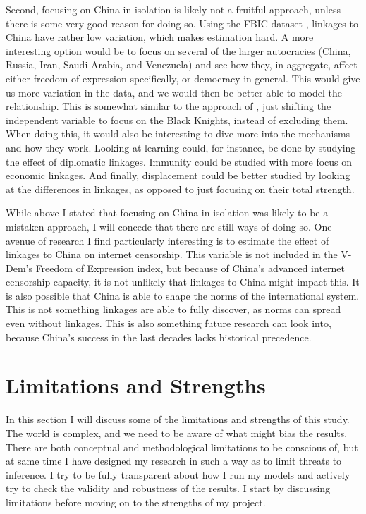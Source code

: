 Second, focusing on China in isolation is likely not a fruitful approach, unless there is some very good reason for doing so. Using the FBIC dataset \citep{moyer_china-us_2021}, linkages to China have rather low variation, which makes estimation hard. A more interesting option would be to focus on several of the larger autocracies (China, Russia, Iran, Saudi Arabia, and Venezuela) and see how they, in aggregate, affect either freedom of expression specifically, or democracy in general. This would give us more variation in the data, and we would then be better able to model the relationship. This is somewhat similar to the approach of \citet{tansey_ties_2017}, just shifting the independent variable to focus on the Black Knights, instead of excluding them. When doing this, it would also be interesting to dive more into the mechanisms and how they work. Looking at learning could, for instance, be done by studying the effect of diplomatic linkages. Immunity could be studied with more focus on economic linkages. And finally, displacement could be better studied by looking at the differences in linkages, as opposed to just focusing on their total strength.

While above I stated that focusing on China in isolation was likely to be a mistaken approach, I will concede that there are still ways of doing so. One avenue of research I find particularly interesting is to estimate the effect of linkages to China on internet censorship. This variable is not included in the V-Dem's Freedom of Expression index, but because of China's advanced internet censorship capacity, it is not unlikely that linkages to China might impact this. It is also possible that China is able to shape the norms of the international system. This is not something linkages are able to fully discover, as norms can spread even without linkages. This is also something future research can look into, because China's success in the last decades lacks historical precedence.

\section{Limitations and Strengths}
In this section I will discuss some of the limitations and strengths of this study. The world is complex, and we need to be aware of what might bias the results. There are both conceptual and methodological limitations to be conscious of, but at same time I have designed my research in such a way as to limit threats to inference. I try to be fully transparent about how I run my models and actively try to check the validity and robustness of the results. I start by discussing limitations before moving on to the strengths of my project.

